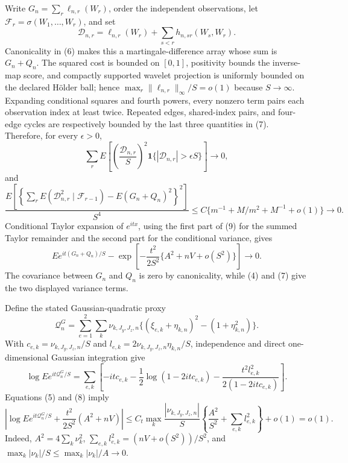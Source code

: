 Write \(G_n=\sum_r\ell_{n,r}(W_r)\), order the independent observations, let \(\mathcal F_r=\sigma(W_1,\ldots,W_r)\), and set
\[
\mathcal D_{n,r}=\ell_{n,r}(W_r)+\sum_{s<r}h_{n,sr}(W_s,W_r).
\]
Canonicality in (6) makes this a martingale-difference array whose sum is \(G_n+Q_n\).  The squared cost is bounded on \([0,1]\), positivity bounds the inverse-map score, and compactly supported wavelet projection is uniformly bounded on the declared H\"older ball; hence \(\max_r\|\ell_{n,r}\|_\infty/S=o(1)\) because \(S\to\infty\).  Expanding conditional squares and fourth powers, every nonzero term pairs each observation index at least twice.  Repeated edges, shared-index pairs, and four-edge cycles are respectively bounded by the last three quantities in (7).  Therefore, for every \(\epsilon>0\),
\[
\sum_rE\left[\left(\frac{\mathcal D_{n,r}}S\right)^2
\mathbf 1\{|\mathcal D_{n,r}|>\epsilon S\}\right]\longrightarrow0,
\]
and
\[
\frac{E\left[\left\{\sum_rE(\mathcal D_{n,r}^2\mid\mathcal F_{r-1})
-E(G_n+Q_n)^2\right\}^2\right]}{S^4}
\le C\{m^{-1}+M/m^2+M^{-1}+o(1)\}\longrightarrow0.                  \tag{9}
\]
Conditional Taylor expansion of \(e^{itx}\), using the first part of (9) for the summed Taylor remainder and the second part for the conditional variance, gives
\[
E e^{it(G_n+Q_n)/S}
-\exp\left[-\frac{t^2}{2S^2}\{A^2+nV+o(S^2)\}\right]\longrightarrow0. \tag{10}
\]
The covariance between \(G_n\) and \(Q_n\) is zero by canonicality, while (4) and (7) give the two displayed variance terms.

Define the stated Gaussian-quadratic proxy
\[
\mathcal Q_n^G=\sum_{e=1}^2\sum_k\nu_{k,J_y,J_z,n}
\{(\xi_{e,k}+\eta_{k,n})^2-(1+\eta_{k,n}^2)\}.
\]
With \(c_{e,k}=\nu_{k,J_y,J_z,n}/S\) and \(l_{e,k}=2\nu_{k,J_y,J_z,n}\eta_{k,n}/S\), independence and direct one-dimensional Gaussian integration give
\[
\log Ee^{it\mathcal Q_n^G/S}
=\sum_{e,k}\left[-itc_{e,k}-\frac12\log(1-2itc_{e,k})
-\frac{t^2l_{e,k}^2}{2(1-2itc_{e,k})}\right].                         \tag{11}
\]
Equations (5) and (8) imply
\[
\left|\log Ee^{it\mathcal Q_n^G/S}
+\frac{t^2}{2S^2}(A^2+nV)\right|
\le C_t\max_k\frac{|\nu_{k,J_y,J_z,n}|}{S}
\left\{\frac{A^2}{S^2}+\sum_{e,k}l_{e,k}^2\right\}+o(1)
=o(1).                                                                  \tag{12}
\]
Indeed, \(A^2=4\sum_k\nu_k^2\), \(\sum_{e,k}l_{e,k}^2=(nV+o(S^2))/S^2\), and \(\max_k|\nu_k|/S\le\max_k|\nu_k|/A\to0\).

